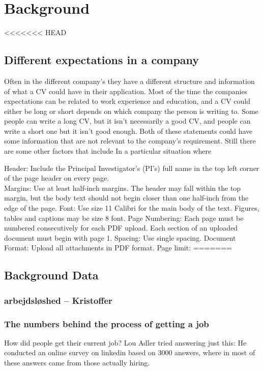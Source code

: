 \section{Background}\label{sec:background}
<<<<<<< HEAD
\subsection{Different expectations in a company}
Often in the different company's they have a different structure and information of what a CV could have in their application.
Most of the time the companies expectations can be related to work experience and education,
and a CV could either be long or short depends on which company the person is writing to. Some people can write a long CV,
but it isn't necessarily a good CV, and people can write a short one but it isn't good enough. 
Both of these statements could have some information that are not relevant to the company's requirement. Still there are some other
factors that include  In a particular situation 
where 

Header: Include the Principal Investigator’s (PI’s) full name in the top left corner of the page header on every page. \\
Margins: Use at least half-inch margins. The header may fall within the top margin, but the body text should not begin closer than one half-inch from the edge of the page.
Font: Use size 11 Calibri for the main body of the text. Figures, tables and captions may be size 8 font.
Page Numbering: Each page must be numbered consecutively for each PDF upload. Each section of an uploaded document must begin with page 1.
Spacing: Use single spacing.
Document Format: Upload all attachments in PDF format.
Page limit: 
=======



\subsection{Background Data}

\subsubsection{arbejdsløshed -- Kristoffer}


\subsubsection{The numbers behind the process of getting a job}
How did people get their current job?
Lou Adler tried answering just this: He conducted an online survey
on linkedin based on 3000 answers, where in most of these answers
came from those actually hiring.

